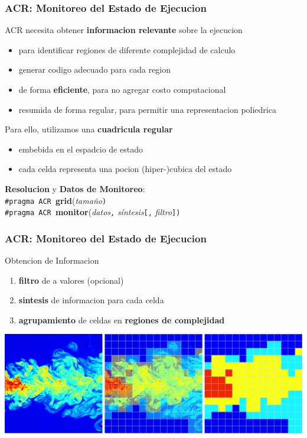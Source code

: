 \documentclass{beamer}\usetheme{Madrid} %
\begin{document}
\begin{frame}[fragile]
\frametitle{ACR: Monitoreo del Estado de Ejecucion}
\begin{block}{}
ACR necesita obtener \textbf{informacion relevante} sobre la ejecucion
\begin{itemize}
\item para identificar regiones de diferente complejidad de calculo
\item generar codigo adecuado para cada region 
\item de forma \textbf{eficiente}, para no agregar costo computacional
\item resumida de forma regular, para permitir una representacion poliedrica
\end{itemize}
\end{block}
\begin{block}{}
Para ello, utilizamos una \textbf{cuadricula regular} 
\begin{itemize}
\item embebida en el espadcio de estado
\item cada celda representa una pocion (hiper-)cubica del estado
\end{itemize} 
\end{block}
\begin{block}{}
\textbf{Resolucion} y \textbf{Datos de Monitoreo}: \\
\lstinline{#pragma ACR }\textbf{grid}(\textit{tamaño}\lstinline{)} \\
\lstinline{#pragma ACR }\textbf{monitor}(\textit{datos}\lstinline{,} 
										\textit{síntesis}\lstinline{[,} 
										\textit{filtro}\lstinline{])} 
\end{block} 
\end{frame}
\begin{frame}
\frametitle{ACR: Monitoreo del Estado de Ejecucion}
\begin{block}{Obtencion de Informacion}
\begin{enumerate} 
\item \textbf{filtro} de a valores  (opcional)
\item \textbf{sintesis} de informacion para cada celda
\item \textbf{agrupamiento} de celdas en \textbf{regiones de complejidad}
\end{enumerate}
\end{block}
\begin{center}
\includegraphics[scale=0.20]{img/turbulent_legal.png} 
\end{center}
\end{frame}
\end{document}
